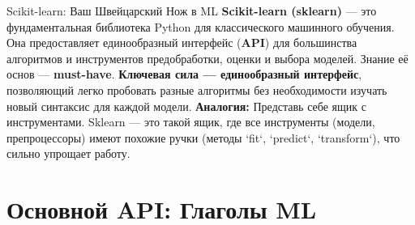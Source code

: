 
\begin{myblock}{Scikit-learn: Ваш Швейцарский Нож в ML}
    \textbf{Scikit-learn (sklearn)} — это фундаментальная библиотека Python для классического машинного обучения. Она предоставляет единообразный интерфейс (\textbf{API}) для большинства алгоритмов и инструментов предобработки, оценки и выбора моделей. Знание её основ — \textbf{must-have}. \textbf{Ключевая сила — единообразный интерфейс}, позволяющий легко пробовать разные алгоритмы без необходимости изучать новый синтаксис для каждой модели.
    \textbf{Аналогия:} Представь себе ящик с инструментами. Sklearn — это такой ящик, где все инструменты (модели, препроцессоры) имеют похожие ручки (методы `fit`, `predict`, `transform`), что сильно упрощает работу.
\end{myblock}

\section{Основной API: Глаголы ML}

